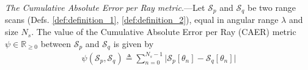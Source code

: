 \begin{definition}
  \label{def:definition_3} \textit{The Cumulative Absolute Error per Ray metric}.---Let
  $\mathcal{S}_p$ and $\mathcal{S}_q$ be two range scans (Defs.
  \ref{def:definition_1}, \ref{def:definition_2}), equal in angular range
  $\lambda$ and size $N_s$. The value of the Cumulative Absolute Error per Ray
  (CAER) metric $\psi \in \mathbb{R}_{\geq 0}$ between $\mathcal{S}_p$ and
  $\mathcal{S}_q$ is given by
  \begin{align}
    \psi(\mathcal{S}_p,\mathcal{S}_q) \triangleq \sum\limits_{n=0}^{N_s-1} \Big| \mathcal{S}_p[\theta_n]-\mathcal{S}_q[\theta_n]\Big| \label{eq:caer}
  \end{align}
\end{definition}



